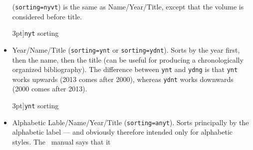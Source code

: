 \begin{itemize}
  (\texttt{sorting=nyvt}) is the same as Name/Year/Title, except that
  the volume is considered before title.
\begin{marginfigure}[-15ex]
  \caption[][3pt]{\texttt{nyt} sorting}
  \end{marginfigure}
\item
  Year/Name/Title (\texttt{sorting=ynt} or \texttt{sorting=ydnt}). Sorts
  by the year first, then the name, then the title (can be useful for
  producing a chronologically organized bibliography). The difference
  between \texttt{ynt} and \texttt{ydng} is that \texttt{ynt} works
  upwards (2013 comes after 2000), whereas \texttt{ydnt} works downwards
  (2000 comes after 2013).
  \begin{marginfigure}[1ex]
\caption[][3pt]{\texttt{ynt} sorting}
\end{marginfigure}
\item
  Alphabetic Lable/Name/Year/Title (\texttt{sorting=anyt}). Sorts
  principally by the alphabetic label --- and obviously therefore
  intended only for alphabetic styles. The \biblatex~manual says that it

\end{itemize}
